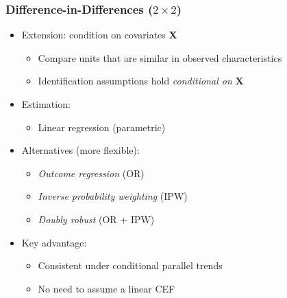 \documentclass[12pt, compress]{beamer}
\begin{document}
\begin{frame}
	\frametitle{Difference-in-Differences ($2 \times 2$)}

\begin{itemize}
	\item Extension: condition on covariates $\mathbf{X}$
	\begin{itemize}
		\item Compare units that are similar in observed characteristics
		\item Identification assumptions hold \textit{conditional on} $\mathbf{X}$
	\end{itemize}
	
	\medskip
	
	\item Estimation:
	\begin{itemize}
		\item Linear regression (parametric)
	\end{itemize}
	
	\medskip
	
	\item Alternatives (more flexible):
	\begin{itemize}
		\item \textit{Outcome regression} (OR)
		\item \textit{Inverse probability weighting} (IPW)
		\item \textit{Doubly robust} (OR + IPW)
	\end{itemize}
	
	\medskip
	
	\item Key advantage:
	\begin{itemize}
		\item Consistent under conditional parallel trends
		\item No need to assume a linear CEF
	\end{itemize}
\end{itemize}

\end{frame}
\end{document}
